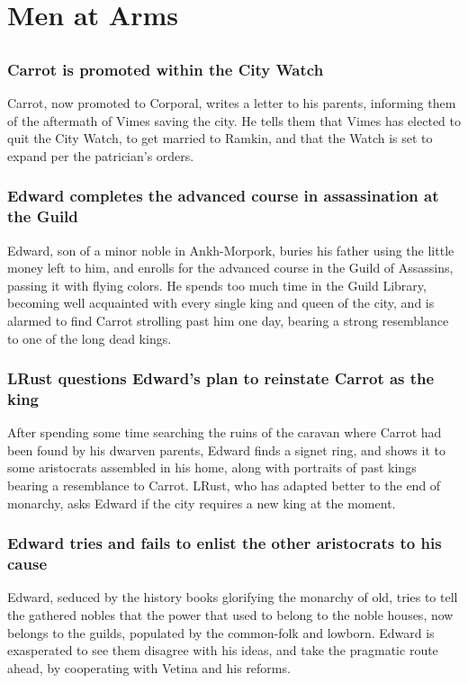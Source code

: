 \section{Men at Arms}


\subsection{}
\subsubsection{\Gls{Carrot} is promoted within the City Watch}
\Gls{Carrot}, now promoted to Corporal, writes a letter to his parents, informing them of the
aftermath of \Gls{Vimes} saving the city. He tells them that \Gls{Vimes} has elected to quit the
City Watch, to get married to \Gls{Ramkin}, and that the Watch is set to expand per the patrician's
orders.

\subsubsection{\Gls{Edward} completes the advanced course in assassination at the Guild}
\Gls{Edward}, son of a minor noble in Ankh-Morpork, buries his father using the little money left
to him, and enrolls for the advanced course in the Guild of Assassins, passing it with flying
colors. He spends too much time in the Guild Library, becoming well acquainted with every single
king and queen of the city, and is alarmed to find \Gls{Carrot} strolling past him one day, bearing
a strong resemblance to one of the long dead kings.

\subsubsection{\Gls{LRust} questions \Gls{Edward}'s plan to reinstate \Gls{Carrot} as the king}
After spending some time searching the ruins of the caravan where \Gls{Carrot} had been found by his
dwarven parents, \Gls{Edward} finds a signet ring, and shows it to some aristocrats assembled in
his home, along with portraits of past kings bearing a resemblance to \Gls{Carrot}. \Gls{LRust},
who has adapted better to the end of monarchy, asks \Gls{Edward} if the city requires a new king at
the moment.

\subsubsection{\Gls{Edward} tries and fails to enlist the other aristocrats to his cause}
\Gls{Edward}, seduced by the history books glorifying the monarchy of old, tries to tell the
gathered nobles that the power that used to belong to the noble houses, now belongs to the guilds,
populated by the common-folk and lowborn. \Gls{Edward} is exasperated to see them disagree with his
ideas, and take the pragmatic route ahead, by cooperating with \Gls{Vetina} and his reforms.


